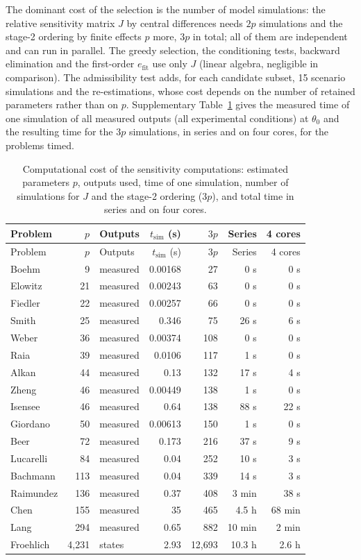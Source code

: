 
The dominant cost of the selection is the number of model simulations: the relative sensitivity matrix $J$ by central differences needs $2p$ simulations and the stage-2 ordering by finite effects $p$ more, $3p$ in total; all of them are independent and can run in parallel. The greedy selection, the conditioning tests, backward elimination and the first-order $e_{\mathrm{fit}}$ use only $J$ (linear algebra, negligible in comparison). The admissibility test adds, for each candidate subset, 15 scenario simulations and the re-estimations, whose cost depends on the number of retained parameters rather than on $p$. Supplementary Table~\ref{tab:cost} gives the measured time of one simulation of all measured outputs (all experimental conditions) at $\theta_0$ and the resulting time for the $3p$ simulations, in series and on four cores, for the problems timed.

{\small
\begin{longtable}{@{}lrlrrrr@{}}
\caption{Computational cost of the sensitivity computations: estimated parameters $p$, outputs used, time of one simulation, number of simulations for $J$ and the stage-2 ordering ($3p$), and total time in series and on four cores.}\label{tab:cost}\\
\toprule Problem & $p$ & Outputs & $t_{\mathrm{sim}}$ (s) & $3p$ & Series & 4 cores \\ \midrule \endfirsthead
\toprule Problem & $p$ & Outputs & $t_{\mathrm{sim}}$ (s) & $3p$ & Series & 4 cores \\ \midrule \endhead
Boehm & 9 & measured & 0.00168 & 27 & 0 s & 0 s \\
Elowitz & 21 & measured & 0.00243 & 63 & 0 s & 0 s \\
Fiedler & 22 & measured & 0.00257 & 66 & 0 s & 0 s \\
Smith & 25 & measured & 0.346 & 75 & 26 s & 6 s \\
Weber & 36 & measured & 0.00374 & 108 & 0 s & 0 s \\
Raia & 39 & measured & 0.0106 & 117 & 1 s & 0 s \\
Alkan & 44 & measured & 0.13 & 132 & 17 s & 4 s \\
Zheng & 46 & measured & 0.00449 & 138 & 1 s & 0 s \\
Isensee & 46 & measured & 0.64 & 138 & 88 s & 22 s \\
Giordano & 50 & measured & 0.00613 & 150 & 1 s & 0 s \\
Beer & 72 & measured & 0.173 & 216 & 37 s & 9 s \\
Lucarelli & 84 & measured & 0.04 & 252 & 10 s & 3 s \\
Bachmann & 113 & measured & 0.04 & 339 & 14 s & 3 s \\
Raimundez & 136 & measured & 0.37 & 408 & 3 min & 38 s \\
Chen & 155 & measured & 35 & 465 & 4.5 h & 68 min \\
Lang & 294 & measured & 0.65 & 882 & 10 min & 2 min \\
Froehlich & 4,231 & states & 2.93 & 12,693 & 10.3 h & 2.6 h \\
\bottomrule \end{longtable}}

